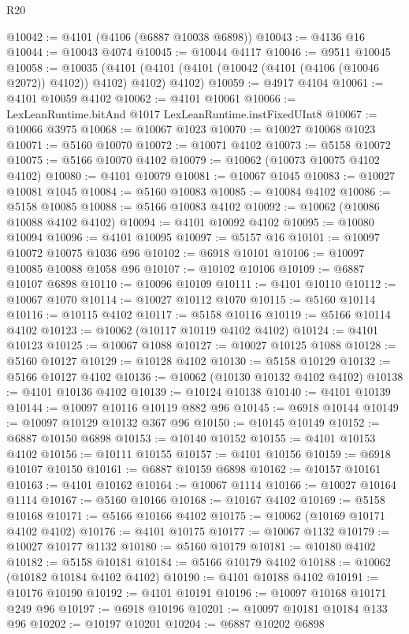 \begin{lexlean}{R20}
\begin{coremodule}
@10042 := @4101 (@4106 (@6887 @10038 @6898))
@10043 := @4136 @16
@10044 := @10043 @4074
@10045 := @10044 @4117
@10046 := @9511 @10045
@10058 := @10035
    (@4101 (@4101 (@4101 (@10042 (@4101 (@4106 (@10046 @2072)) @4102)) @4102) @4102) @4102)
@10059 := @4917 @4104
@10061 := @4101 @10059 @4102
@10062 := @4101 @10061
@10066 := LexLeanRuntime.bitAnd @1017 LexLeanRuntime.instFixedUInt8
@10067 := @10066 @3975
@10068 := @10067 @1023
@10070 := @10027 @10068 @1023
@10071 := @5160 @10070
@10072 := @10071 @4102
@10073 := @5158 @10072
@10075 := @5166 @10070 @4102
@10079 := @10062 (@10073 @10075 @4102 @4102)
@10080 := @4101 @10079
@10081 := @10067 @1045
@10083 := @10027 @10081 @1045
@10084 := @5160 @10083
@10085 := @10084 @4102
@10086 := @5158 @10085
@10088 := @5166 @10083 @4102
@10092 := @10062 (@10086 @10088 @4102 @4102)
@10094 := @4101 @10092 @4102
@10095 := @10080 @10094
@10096 := @4101 @10095
@10097 := @5157 @16
@10101 := @10097 @10072 @10075 @1036 @96
@10102 := @6918 @10101
@10106 := @10097 @10085 @10088 @1058 @96
@10107 := @10102 @10106
@10109 := @6887 @10107 @6898
@10110 := @10096 @10109
@10111 := @4101 @10110
@10112 := @10067 @1070
@10114 := @10027 @10112 @1070
@10115 := @5160 @10114
@10116 := @10115 @4102
@10117 := @5158 @10116
@10119 := @5166 @10114 @4102
@10123 := @10062 (@10117 @10119 @4102 @4102)
@10124 := @4101 @10123
@10125 := @10067 @1088
@10127 := @10027 @10125 @1088
@10128 := @5160 @10127
@10129 := @10128 @4102
@10130 := @5158 @10129
@10132 := @5166 @10127 @4102
@10136 := @10062 (@10130 @10132 @4102 @4102)
@10138 := @4101 @10136 @4102
@10139 := @10124 @10138
@10140 := @4101 @10139
@10144 := @10097 @10116 @10119 @882 @96
@10145 := @6918 @10144
@10149 := @10097 @10129 @10132 @367 @96
@10150 := @10145 @10149
@10152 := @6887 @10150 @6898
@10153 := @10140 @10152
@10155 := @4101 @10153 @4102
@10156 := @10111 @10155
@10157 := @4101 @10156
@10159 := @6918 @10107 @10150
@10161 := @6887 @10159 @6898
@10162 := @10157 @10161
@10163 := @4101 @10162
@10164 := @10067 @1114
@10166 := @10027 @10164 @1114
@10167 := @5160 @10166
@10168 := @10167 @4102
@10169 := @5158 @10168
@10171 := @5166 @10166 @4102
@10175 := @10062 (@10169 @10171 @4102 @4102)
@10176 := @4101 @10175
@10177 := @10067 @1132
@10179 := @10027 @10177 @1132
@10180 := @5160 @10179
@10181 := @10180 @4102
@10182 := @5158 @10181
@10184 := @5166 @10179 @4102
@10188 := @10062 (@10182 @10184 @4102 @4102)
@10190 := @4101 @10188 @4102
@10191 := @10176 @10190
@10192 := @4101 @10191
@10196 := @10097 @10168 @10171 @249 @96
@10197 := @6918 @10196
@10201 := @10097 @10181 @10184 @133 @96
@10202 := @10197 @10201
@10204 := @6887 @10202 @6898

\end{coremodule}
\end{lexlean}
